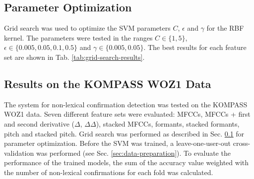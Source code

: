 \documentclass[letterpaper]{article}
\begin{document}
\subsection{Parameter Optimization}\label{sec:parameter-optimization}
\begin{table}[h]
	\caption{Best SVM parameters found with grid search for each feature set}
	\label{tab:grid-search-results}
\end{table}
Grid search was used to optimize the SVM parameters $C$, $\epsilon$ and $\gamma$ for the RBF kernel. The parameters were tested in the ranges $C\in\{1, 5\}$, $\epsilon\in\{0.005, 0.05, 0.1, 0.5\}$ and $\gamma\in\{0.005, 0.05\}$. The best results for each feature set are shown in Tab. \ref{tab:grid-search-results}.
\subsection{Results on the KOMPASS WOZ1 Data}
The system for non-lexical confirmation detection was tested on the KOMPASS WOZ1 data. Seven different feature sets were evaluated: MFCCs, MFCCs + first and second derivative ($\Delta$, $\Delta\Delta$), stacked MFCCs, formants, stacked formants, pitch and stacked pitch. Grid search was performed as described in Sec. \ref{sec:parameter-optimization} for parameter optimization.
Before the SVM was trained, a leave-one-user-out cross-validation was performed (see Sec. \ref{sec:data-preparation}). To evaluate the performance of the trained models, the sum of the accuracy value weighted with the number of non-lexical confirmations for each fold was calculated. 
\end{document}
